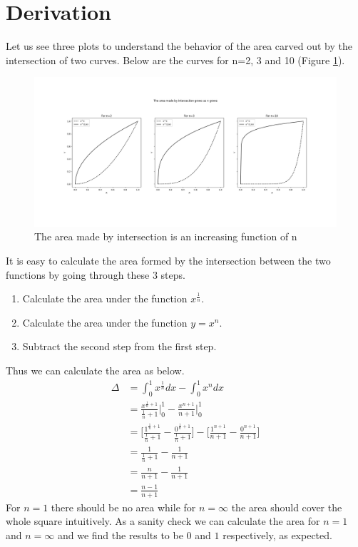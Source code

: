 \documentclass[10pt, twoside]{article}
\begin{document}
\section{Derivation}
Let us see three plots to understand the behavior of the area carved out by the intersection of two curves. Below are the curves for n=2, 3 and 10 (Figure \ref{Area_2_3_10}). 
\begin{figure}[h!]
\includegraphics[width=\linewidth]{All_Three_Plots.png}
\caption{The area made by intersection is an increasing function of n}
\label{Area_2_3_10}
\end{figure}
It is easy to calculate the area formed by the intersection between the two functions by going through these 3 steps.
\begin{enumerate}
\item Calculate the area under the function $x^{\frac{1}{n}}$.
\item Calculate the area under the function $y=x^n$.
\item Subtract the second step from the first step.
\end{enumerate}
Thus we can calculate the area as below.
\begin{align*}
 \Delta &= \int_{0}^{1}x^{\frac{1}{n}}dx - \int_{0}^{1}x^{n}dx \\
 &= \frac{x^{\frac{1}{n}+1}}{\frac{1}{n}+1} \Big|_0^1 - \frac{x^{n+1}}{n+1} \Big|_0^1 \\
 &= \Big[\frac{1^{\frac{1}{n}+1}}{\frac{1}{n}+1} - \frac{0^{\frac{1}{n}+1}}{\frac{1}{n}+1}\Big] - \Big[\frac{1^{n+1}}{n+1} - \frac{0^{n+1}}{n+1} \Big] \\
 &= \frac{1}{\frac{1}{n}+1} - \frac{1}{n+1}\\
 &= \frac{n}{n+1} - \frac{1}{n+1} \\
 &= \frac{n-1}{n+1}
\end{align*}
For $n=1$ there should be no area while for $n=\infty$ the area should cover the whole square intuitively. As a sanity check we can calculate the area for $n=1$ and $n=\infty$ and we find the results to be $0$ and $1$ respectively, as expected. 
\end{document}

